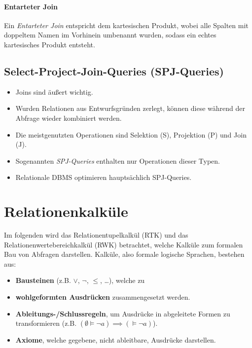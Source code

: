                 \paragraph{Entarteter Join} %
                    Ein \textit{Entarteter Join} entspricht dem kartesischen Produkt, wobei alle Spalten mit doppeltem Namen im Vorhinein umbenannt wurden, sodass ein echtes kartesisches Produkt entsteht.

        \subsection{Select-Project-Join-Queries (SPJ-Queries)} %
            \begin{itemize}
            	\item Joins sind äußert wichtig.
            	\item Wurden Relationen aus Entwurfsgründen zerlegt, können diese während der Abfrage wieder kombiniert werden.
            	\item Die meistgenutzten Operationen sind Selektion (S), Projektion (P) und Join (J).
            	\item Sogenannten \textit{SPJ-Queries} enthalten nur Operationen dieser Typen.
            	\item Relationale DBMS optimieren hauptsächlich SPJ-Queries.
            \end{itemize}

    \section{Relationenkalküle} %
        Im folgenden wird das Relationentupelkalkül (RTK) und das Relationenwertebereichkalkül (RWK) betrachtet, welche Kalküle zum formalen Bau von Abfragen darstellen. Kalküle, also formale logische Sprachen, bestehen aus:
        \begin{itemize}
        	\item \textbf{Bausteinen} (z.B. \(\lor\), \(\lnot\), \(\leq\), \dots), welche zu
        	\item \textbf{wohlgeformten Ausdrücken} zusammengesetzt werden.
        	\item \textbf{Ableitungs-/Schlussregeln}, um Ausdrücke in abgeleitete Formen zu transformieren (z.B. \( (\emptyset \models \lnot a) \implies (\models \lnot a) \)).
        	\item \textbf{Axiome}, welche gegebene, nicht ableitbare, Ausdrücke darstellen.
        \end{itemize}

